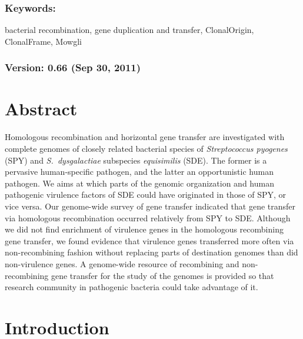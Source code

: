 \documentclass[english]{article}
\begin{document}
\subsubsection*{Keywords:}

bacterial recombination, gene duplication and transfer, ClonalOrigin,
ClonalFrame, Mowgli


\subsubsection*{Version: 0.66 (Sep 30, 2011) \clearpage{}}


\section*{Abstract}
Homologous recombination and horizontal gene transfer are investigated with
complete genomes of closely related bacterial species of \textit{Streptococcus
pyogenes} (SPY) and \textit{S.\ dysgalactiae} subspecies \textit{equisimilis}
(SDE).  The former is a pervasive human-specific pathogen, and the latter an
opportunistic human pathogen.  We aims at which parts of the genomic
organization and human pathogenic virulence factors of SDE could have
originated in those of SPY, or vice versa.  Our genome-wide survey of gene
transfer indicated that gene transfer via homologous recombination occurred
relatively from SPY to SDE.  Although we did not find enrichment of virulence
genes in the homologous recombining gene transfer, we found evidence that
virulence genes transferred more often via non-recombining fashion without
replacing parts of destination genomes than did non-virulence genes.  A
genome-wide resource of recombining and non-recombining gene transfer for the
study of the genomes is provided so that research community in pathogenic
bacteria could take advantage of it.

\clearpage{}

\section{Introduction}
\end{document}

